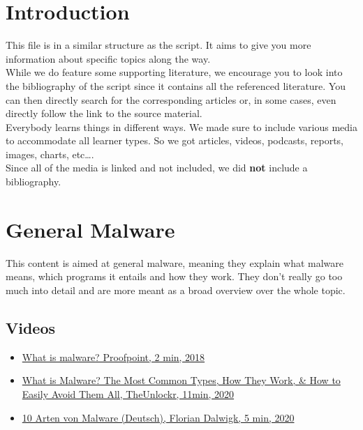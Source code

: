 \chapter{Introduction}

This file is in a similar structure as the script.
It aims to give you more information about specific topics along the way.
\\

While we do feature some supporting literature, we encourage you to look into the bibliography of the script since it contains all the referenced literature.
You can then directly search for the corresponding articles or, in some cases, even directly follow the link to the source material.
\\

Everybody learns things in different ways.
We made sure to include various media to accommodate all learner types.
So we got articles, videos, podcasts, reports, images, charts, etc\dots.
\\

Since all of the media is linked and not included, we did \textbf{not} include a bibliography.

\chapter{General Malware}

This content is aimed at general malware, meaning they explain what malware means, which programs it entails and how they work.
They don't really go too much into detail and are more meant as a broad overview over the whole topic.

\section{Videos}

\begin{itemize}
    \item \href{https://www.youtube.com/watch?v=AfZxUK9U3hE}{What is malware? Proofpoint, 2 min, 2018}
    \item \href{https://www.youtube.com/watch?v=QozdEbyMK5E}{What is Malware? The Most Common Types, How They Work, \& How to Easily Avoid Them All, TheUnlockr, 11min, 2020}
    \item \href{https://www.youtube.com/watch?v=wNY2gnbPpks}{10 Arten von Malware (Deutsch), Florian Dalwigk, 5 min, 2020}
\end{itemize}

